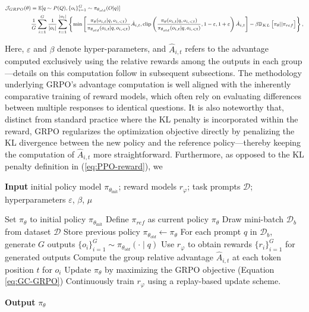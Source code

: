 \begin{itemize}[topsep=0pt]
\begin{equation}
\footnotesize
\begin{split}
    \mathcal{J}_{GRPO}(\theta) &= \mathbb{E}{[q \sim P(Q), \{o_i\}_{i=1}^G \sim \pi_{\theta_{old}}(O|q)]}  \\
    & \frac{1}{G}\sum_{i=1}^G\frac{1}{|o_i|} \sum_{t=1}^{|o_i|} \left\{ \min \left[ \frac{\pi_\theta(o_{i,t} | q, o_{i,<t})}{\pi_{\theta_{old}}(o_{i,t} | q, o_{i,<t})} \hat{A}_{i,t}, \text{clip} \left( \frac{\pi_\theta(o_{i,t} | q, o_{i,<t})}{\pi_{\theta_{old}}(o_{i,t} | q, o_{i,<t})}, 1 - \varepsilon, 1 + \varepsilon \right)  \hat{A}_{i,t} \right] - \beta \mathbb{D}_{KL}\left[\pi_{\theta} || \pi_{ref}\right]\right\} ,
\end{split}
\label{eq:GRPO-obj}
\end{equation}

Here, $\varepsilon$ and $\beta$ denote hyper-parameters, and $\hat{A}_{i,t}$ refers to the advantage computed exclusively using the relative rewards among the outputs in each group—details on this computation follow in subsequent subsections. The methodology underlying GRPO’s advantage computation is well aligned with the inherently comparative training of reward models, which often rely on evaluating differences between multiple responses to identical questions. It is also noteworthy that, distinct from standard practice where the KL penalty is incorporated within the reward, GRPO regularizes the optimization objective directly by penalizing the KL divergence between the new policy and the reference policy—thereby keeping the computation of $\hat{A}_{i,t}$ more straightforward. Furthermore, as opposed to the KL penalty definition in (\ref{eq:PPO-reward}), we

\begin{algorithm}[t]
  \small
  \caption{Iterative Group Relative Policy Optimization}
  \textbf{Input} initial policy model $\pi_{\theta_{\text{init}}}$; reward models $r_\varphi$; task prompts $\mathcal{D}$; 
  hyperparameters $\varepsilon$, $\beta$, $\mu$
  \begin{algorithmic}[1]
    \State Set $\pi_\theta$ to initial policy $\pi_{\theta_{\text{init}}}$
       \State Define $\pi_{ref}$ as current policy $\pi_{\theta}$
      \State Draw mini-batch $\mathcal{D}_b$ from dataset $\mathcal{D}$
      \State Store previous policy $\pi_{\theta_{old}} \leftarrow \pi_{\theta}$ 
      \State For each prompt $q$ in $\mathcal{D}_b$, generate $G$ outputs $\{o_i\}_{i=1}^G \sim \pi_{\theta_{old}} (\cdot \mid q)$
      \State Use $r_{\varphi}$ to obtain rewards $\{r_i\}_{i=1}^G$ for generated outputs
      \State Compute the group relative advantage $\hat{A}_{i,t}$ at each token position $t$ for $o_i$
        \State Update $\pi_\theta$ by maximizing the GRPO objective (Equation \ref{eq:GC-GRPO})
      \EndFor
    \EndFor \State Continuously train $r_\varphi$ using a replay-based update scheme.
    \EndFor 
  \end{algorithmic}
  \textbf{Output} $\pi_\theta$
  \label{alg:iter-grpo}
\end{algorithm}


\end{itemize}
